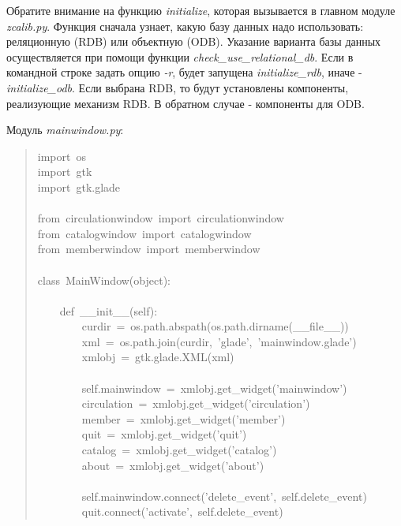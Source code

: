 \documentclass[14pt,a4paper,openany,twoside,final]{extbook}
\providecommand*{\DUroletitlereference}[1]{\textsl{#1}}
\begin{document}
Обратите внимание на функцию \DUroletitlereference{initialize}, которая вызывается в
главном модуле \DUroletitlereference{zcalib.py}.  Функция сначала узнает, какую базу данных
надо использовать: реляционную (RDB) или объектную (ODB).  Указание
варианта базы данных осуществляется при помощи функции
\DUroletitlereference{check\_use\_relational\_db}.  Если в командной строке задать опцию \DUroletitlereference{-r},
будет запущена \DUroletitlereference{initialize\_rdb}, иначе - \DUroletitlereference{initialize\_odb}.  Если
выбрана RDB, то будут установлены компоненты, реализующие механизм
RDB.  В обратном случае - компоненты для ODB.

Модуль \DUroletitlereference{mainwindow.py}:

\begin{quote}{\ttfamily \raggedright \noindent
import~os\\
import~gtk\\
import~gtk.glade\\
~\\
from~circulationwindow~import~circulationwindow\\
from~catalogwindow~import~catalogwindow\\
from~memberwindow~import~memberwindow\\
~\\
class~MainWindow(object):\\
~\\
~~~~def~\_\_init\_\_(self):\\
~~~~~~~~curdir~=~os.path.abspath(os.path.dirname(\_\_file\_\_))\\
~~~~~~~~xml~=~os.path.join(curdir,~'glade',~'mainwindow.glade')\\
~~~~~~~~xmlobj~=~gtk.glade.XML(xml)\\
~\\
~~~~~~~~self.mainwindow~=~xmlobj.get\_widget('mainwindow')\\
~~~~~~~~circulation~=~xmlobj.get\_widget('circulation')\\
~~~~~~~~member~=~xmlobj.get\_widget('member')\\
~~~~~~~~quit~=~xmlobj.get\_widget('quit')\\
~~~~~~~~catalog~=~xmlobj.get\_widget('catalog')\\
~~~~~~~~about~=~xmlobj.get\_widget('about')\\
~\\
~~~~~~~~self.mainwindow.connect('delete\_event',~self.delete\_event)\\
~~~~~~~~quit.connect('activate',~self.delete\_event)\\
}
\end{quote}
\end{document}
